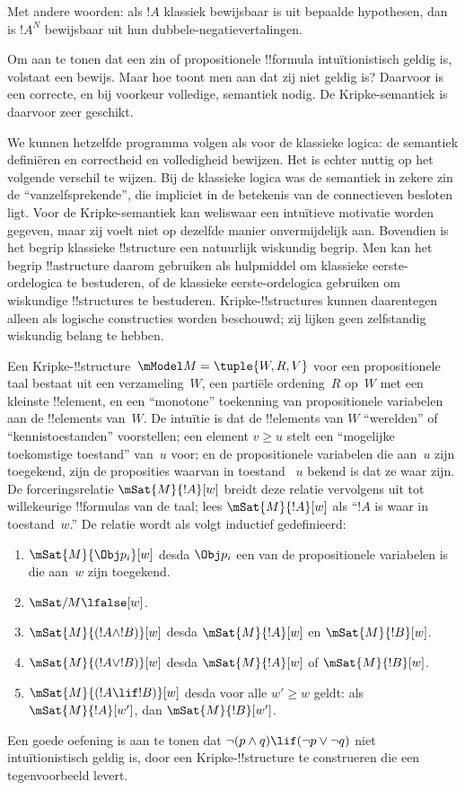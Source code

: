 \documentclass[openany]{memoir}
\begin{document}
Met andere woorden: als $!A$ klassiek bewijsbaar is uit bepaalde hypothesen, dan
is $!A^N$ bewijsbaar uit hun dubbele-negatievertalingen.

Om aan te tonen dat een zin of propositionele !!{formula} intuïtionistisch geldig
is, volstaat een bewijs. Maar hoe toont men aan dat zij niet geldig is? Daarvoor
is een correcte, en bij voorkeur volledige, semantiek nodig. De
Kripke-semantiek is daarvoor zeer geschikt.

We kunnen hetzelfde programma volgen als voor de klassieke logica: de semantiek
definiëren en correctheid en volledigheid bewijzen. Het is echter nuttig op het
volgende verschil te wijzen. Bij de klassieke logica was de semantiek in zekere
zin de ``vanzelfsprekende'', die impliciet in de betekenis van de connectieven
besloten ligt. Voor de Kripke-semantiek kan weliswaar een intuïtieve motivatie
worden gegeven, maar zij voelt niet op dezelfde manier onvermijdelijk aan.
Bovendien is het begrip klassieke !!{structure} een natuurlijk wiskundig begrip.
Men kan het begrip !!a{structure} daarom gebruiken als hulpmiddel om klassieke
eerste-ordelogica te bestuderen, of de klassieke eerste-ordelogica gebruiken om
wiskundige !!{structure}s te bestuderen. Kripke-!!{structure}s kunnen daarentegen
alleen als logische constructies worden beschouwd; zij lijken geen zelfstandig
wiskundig belang te hebben.

Een Kripke-!!{structure}~$\mModel M = \tuple{W, R, V}$ voor een propositionele
taal bestaat uit een verzameling~$W$, een partiële ordening~$R$ op~$W$ met een
kleinste !!{element}, en een ``monotone'' toekenning van propositionele
variabelen aan de !!{element}s van~$W$. De intuïtie is dat de !!{element}s van
$W$ ``werelden'' of ``kennistoestanden'' voorstellen; een element $v \geq u$
stelt een ``mogelijke toekomstige toestand'' van~$u$ voor; en de propositionele
variabelen die aan~$u$ zijn toegekend, zijn de proposities waarvan in toestand
~$u$ bekend is dat ze waar zijn. De forceringsrelatie $\mSat{M}{!A}[w]$ breidt
deze relatie vervolgens uit tot willekeurige !!{formula}s van de taal; lees
$\mSat{M}{!A}[w]$ als ``$!A$ is waar in toestand~$w$.'' De relatie wordt als
volgt inductief gedefinieerd:
\begin{enumerate}
\item $\mSat{M}{\Obj p_i}[w]$ desda $\Obj p_i$ een van de propositionele
  variabelen is die aan~$w$ zijn toegekend.
\item $\mSat/{M}{\lfalse}[w]$.
\item $\mSat{M}{(!A \land !B)}[w]$ desda $\mSat{M}{!A}[w]$ en $\mSat{M}{!B}[w]$.
\item $\mSat{M}{(!A \lor !B)}[w]$ desda $\mSat{M}{!A}[w]$ of $\mSat{M}{!B}[w]$.
\item $\mSat{M}{(!A \lif !B)}[w]$ desda voor alle $w' \geq w$ geldt: als
  $\mSat{M}{!A}[w']$, dan $\mSat{M}{!B}[w']$.
\end{enumerate}
Een goede oefening is aan te tonen dat $\lnot (p \land q) \lif
(\lnot p \lor \lnot q)$ niet intuïtionistisch geldig is, door een
Kripke-!!{structure} te construeren die een tegenvoorbeeld levert.
\endgroup
\end{document}
